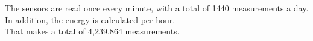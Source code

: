 \documentclass{scrartcl}
\begin{document}
The sensors are read once every minute, with a total of 1440 measurements a day. In addition, the energy is calculated per hour.\\

That makes a total of 4,239,864 measurements.








%



%
\end{document}
